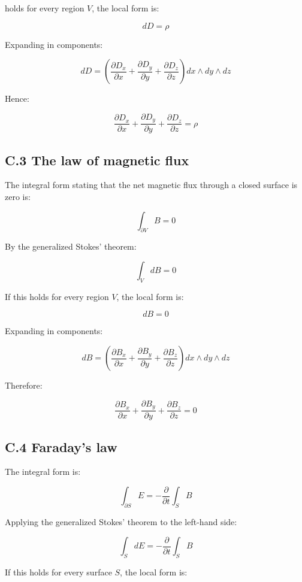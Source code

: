 \documentclass[a4paper,12pt,openany]{book}
\begin{document}
holds for every region \(V\), the local form is:

\[
dD=\rho
\]

Expanding in components:

\[
dD
=
\left(\frac{\partial D_x}{\partial x}
{}+\frac{\partial D_y}{\partial y}
{}+\frac{\partial D_z}{\partial z}\right)
dx\wedge dy\wedge dz
\]

Hence:

\[
\frac{\partial D_x}{\partial x}
{}+\frac{\partial D_y}{\partial y}
{}+\frac{\partial D_z}{\partial z}
=\rho
\]

\hypertarget{c.3-the-law-of-magnetic-flux}{%
\subsection*{C.3 The law of magnetic
flux}\label{c.3-the-law-of-magnetic-flux}}

The integral form stating that the net magnetic flux through a closed
surface is zero is:

\[
\int_{\partial V}B=0
\]

By the generalized Stokes' theorem:

\[
\int_V dB=0
\]

If this holds for every region \(V\), the local form is:

\[
dB=0
\]

Expanding in components:

\[
dB
=
\left(\frac{\partial B_x}{\partial x}
{}+\frac{\partial B_y}{\partial y}
{}+\frac{\partial B_z}{\partial z}\right)
dx\wedge dy\wedge dz
\]

Therefore:

\[
\frac{\partial B_x}{\partial x}
{}+\frac{\partial B_y}{\partial y}
{}+\frac{\partial B_z}{\partial z}
=0
\]

\hypertarget{c.4-faradays-law}{%
\subsection*{C.4 Faraday's law}\label{c.4-faradays-law}}

The integral form is:

\[
\int_{\partial S}E
=
-\frac{\partial}{\partial t}\int_S B
\]

Applying the generalized Stokes' theorem to the left-hand side:

\[
\int_S dE
=
-\frac{\partial}{\partial t}\int_S B
\]

If this holds for every surface \(S\), the local form is:
\end{document}
